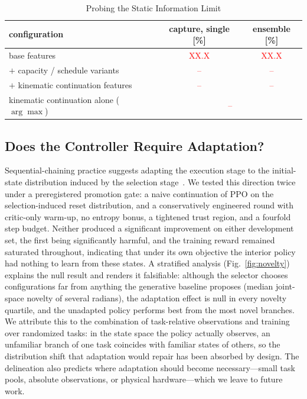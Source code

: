 \documentclass[journal]{IEEEtran}
\newcommand{\ph}[1]{\textcolor{red}{#1}}          %
\newcommand{\phCapSingle}{\ph{XX.X}}         %
\newcommand{\phCapEns}{\ph{XX.X}}            %
\begin{document}
\begin{table}[!t]
\caption{Probing the Static Information Limit}
\label{tab:boundary}
\centering
\begin{tabular}{lcc}
\toprule
configuration & capture, single [\%] & ensemble [\%]\\
\midrule
base features & \phCapSingle & \phCapEns\\
$+$ capacity / schedule variants & \ph{--} & \ph{--}\\
$+$ kinematic continuation features & \ph{--} & \ph{--}\\
\midrule
kinematic continuation alone ($\arg\max$) &
\multicolumn{2}{c}{\ph{--}}\\
\bottomrule
\end{tabular}
\end{table}

\subsection{Does the Controller Require Adaptation?}
\label{sec:res-coupling}
Sequential-chaining practice suggests adapting the execution stage to the
initial-state distribution induced by the selection
stage~\cite{chen2023sequential}. We tested this direction twice under a
preregistered promotion gate: a naive continuation of PPO on the
selection-induced reset distribution, and a conservatively engineered
round with critic-only warm-up, no entropy bonus, a tightened trust
region, and a fourfold step budget. Neither produced a significant
improvement on either development set, the first being significantly
harmful, and the training reward remained saturated throughout,
indicating that under its own objective the interior policy had nothing
to learn from these states. A stratified analysis
(Fig.~\ref{fig:novelty}) explains the null result and renders it
falsifiable: although the selector chooses configurations far from
anything the generative baseline proposes (median joint-space novelty of
several radians), the adaptation effect is null in every novelty
quartile, and the unadapted policy performs best from the most novel
branches. We attribute this to the combination of task-relative
observations and training over randomized tasks: in the state space the
policy actually observes, an unfamiliar branch of one task coincides
with familiar states of others, so the distribution shift that
adaptation would repair has been absorbed by design. The delineation
also predicts where adaptation should become necessary---small task
pools, absolute observations, or physical hardware---which we leave to
future work.
\end{document}
